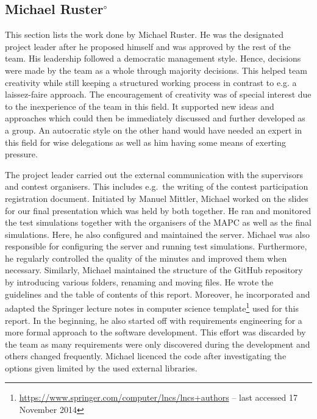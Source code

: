 \subsection[Michael Ruster]{Michael Ruster$^{\circ}$}
This section lists the work done by Michael Ruster.
He was the designated project leader after he proposed himself and was approved by the rest of the team.
His leadership followed a democratic management style.
Hence, decisions were made by the team as a whole through majority decisions.
This helped team creativity while still keeping a structured working process in contrast to e.g. a laissez-faire approach.
The encouragement of creativity was of special interest due to the inexperience of the team in this field.
It supported new ideas and approaches which could then be immediately discussed and further developed as a group.
An autocratic style on the other hand would have needed an expert in this field for wise delegations as well as him having some means of exerting pressure.

The project leader carried out the external communication with the supervisors and contest organisers.
This includes e.g.\ the writing of the contest participation registration document.
Initiated by Manuel Mittler, Michael worked on the slides for our final presentation which was held by both together.
He ran and monitored the test simulations together with the organisers of the MAPC as well as the final simulations.
Here, he also configured and maintained the server.
Michael was also responsible for configuring the server and running test simulations.
Furthermore, he regularly controlled the quality of the minutes and improved them when necessary.
Similarly, Michael maintained the structure of the GitHub repository by introducing various folders, renaming and moving files.
He wrote the guidelines and the table of contents of this report.
Moreover, he incorporated and adapted the Springer lecture notes in computer science template\footnote{\url{https://www.springer.com/computer/lncs/lncs+authors} -- last accessed 17 November 2014} used for this report.
In the beginning, he also started off with requirements engineering for a more formal approach to the software development.
This effort was discarded by the team as many requirements were only discovered during the development and others changed frequently.
Michael licenced the code after investigating the options given limited by the used external libraries.

